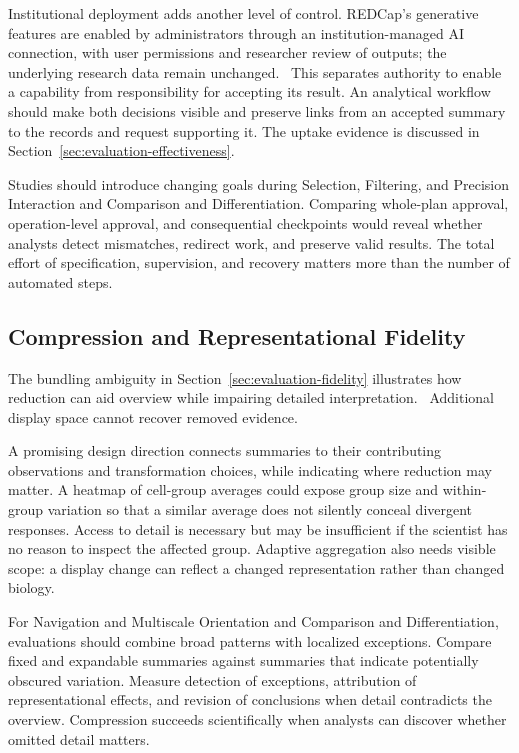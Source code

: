 Institutional deployment adds another level of control. REDCap's generative features are enabled by administrators through an institution-managed AI connection, with user permissions and researcher review of outputs; the underlying research data remain unchanged.~\cite{Shyr2026REDCapAI} This separates authority to enable a capability from responsibility for accepting its result. An analytical workflow should make both decisions visible and preserve links from an accepted summary to the records and request supporting it. The uptake evidence is discussed in Section~\ref{sec:evaluation-effectiveness}.

Studies should introduce changing goals during Selection, Filtering, and Precision Interaction and Comparison and Differentiation. Comparing whole-plan approval, operation-level approval, and consequential checkpoints would reveal whether analysts detect mismatches, redirect work, and preserve valid results. The total effort of specification, supervision, and recovery matters more than the number of automated steps.

\subsection{Compression and Representational Fidelity}
\label{sec:challenges-compression}
The bundling ambiguity in Section~\ref{sec:evaluation-fidelity} illustrates how reduction can aid overview while impairing detailed interpretation.~\cite{EvalHolten2006} Additional display space cannot recover removed evidence.

A promising design direction connects summaries to their contributing observations and transformation choices, while indicating where reduction may matter. A heatmap of cell-group averages could expose group size and within-group variation so that a similar average does not silently conceal divergent responses. Access to detail is necessary but may be insufficient if the scientist has no reason to inspect the affected group. Adaptive aggregation also needs visible scope: a display change can reflect a changed representation rather than changed biology.

For Navigation and Multiscale Orientation and Comparison and Differentiation, evaluations should combine broad patterns with localized exceptions. Compare fixed and expandable summaries against summaries that indicate potentially obscured variation. Measure detection of exceptions, attribution of representational effects, and revision of conclusions when detail contradicts the overview. Compression succeeds scientifically when analysts can discover whether omitted detail matters.

